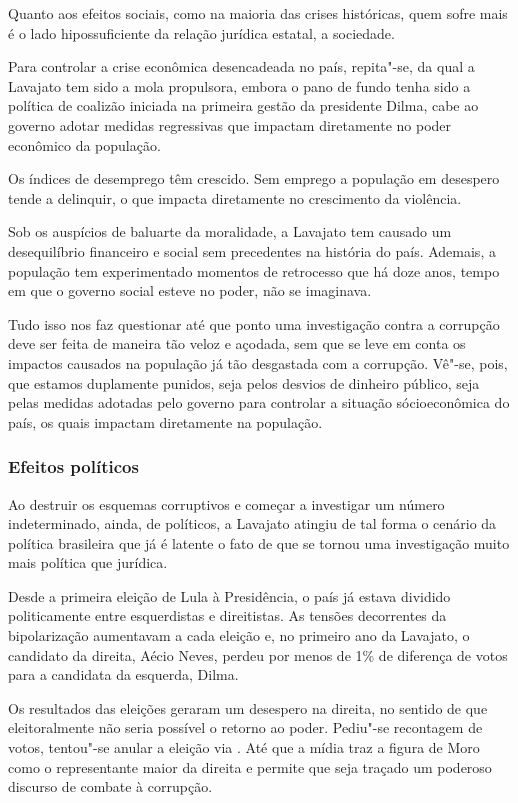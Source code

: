Quanto aos efeitos sociais, como na maioria das crises históricas, quem
sofre mais é o lado hipossuficiente da relação jurídica estatal, a
sociedade.

Para controlar a crise econômica desencadeada no país, repita"-se, da qual
a Lavajato tem sido a mola propulsora, embora o pano de fundo tenha sido
a política de coalizão iniciada na primeira gestão da presidente Dilma,
cabe ao governo adotar medidas regressivas que impactam diretamente no
poder econômico da população.

Os índices de desemprego têm crescido. Sem emprego a população em
desespero tende a delinquir, o que impacta diretamente no crescimento da
violência.

Sob os auspícios de baluarte da moralidade, a Lavajato tem causado um
desequilíbrio financeiro e social sem precedentes na história do país.
Ademais, a população tem experimentado momentos de retrocesso que há
doze anos, tempo em que o governo social esteve no poder, não se
imaginava.

Tudo isso nos faz questionar até que ponto uma investigação contra a
corrupção deve ser feita de maneira tão veloz e açodada, sem que se leve
em conta os impactos causados na população já tão desgastada com a
corrupção. Vê"-se, pois, que estamos duplamente punidos, seja pelos
desvios de dinheiro público, seja pelas medidas adotadas pelo governo
para controlar a situação sócioeconômica do país, os quais impactam
diretamente na população.

\subsubsection{Efeitos políticos}

Ao destruir os esquemas corruptivos e começar a investigar um número
indeterminado, ainda, de políticos, a Lavajato atingiu de tal forma o cenário
da política brasileira que já é latente o fato de que se tornou uma
investigação muito mais política que jurídica.

Desde a primeira eleição de Lula à Presidência, o país já estava
dividido politicamente entre esquerdistas e direitistas. As tensões
decorrentes da bipolarização aumentavam a cada eleição e, no primeiro ano
da Lavajato, o candidato da direita, Aécio Neves, perdeu por menos de
1\% de diferença de votos para a candidata da esquerda, Dilma.

Os resultados das eleições geraram um desespero na direita, no sentido
de que eleitoralmente não seria possível o retorno ao poder. Pediu"-se
recontagem de votos, tentou"-se anular a eleição via . Até que a mídia
traz a figura de Moro como o representante maior da direita e permite
que seja traçado um poderoso discurso de combate à corrupção.


